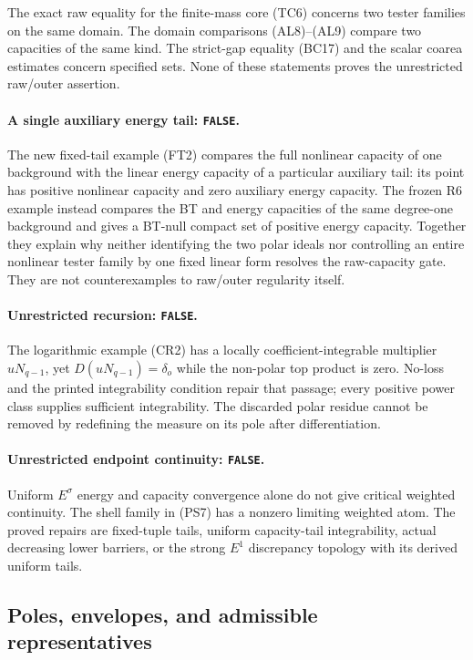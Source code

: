 The exact raw equality for the finite-mass core
(TC6) concerns two tester families on the same
domain.  The domain comparisons (AL8)--(AL9)
compare two capacities of the same kind.
The strict-gap equality (BC17) and the scalar
coarea estimates concern specified sets.
None of these statements proves the unrestricted
raw/outer assertion.

\paragraph{A single auxiliary energy tail: \texttt{FALSE}.}
The new fixed-tail example (FT2) compares the full
nonlinear capacity of one background with the
linear energy capacity of a particular auxiliary
tail: its point has positive nonlinear capacity
and zero auxiliary energy capacity. The frozen R6
example instead compares the BT and energy capacities
of the same degree-one background and gives a BT-null
compact set of positive energy capacity.
Together they explain why neither identifying
the two polar ideals nor controlling an entire
nonlinear tester family by one fixed linear
form resolves the raw-capacity gate.
They are not counterexamples to raw/outer
regularity itself.

\paragraph{Unrestricted recursion: \texttt{FALSE}.}
The logarithmic example (CR2) has a locally
coefficient-integrable multiplier
$uN_{q-1}$, yet
$D(uN_{q-1})=\delta_o$ while the non-polar
top product is zero.
No-loss and the printed integrability
condition repair that passage; every positive
power class supplies sufficient integrability.
The discarded polar residue cannot be removed
by redefining the measure on its pole after
differentiation.

\paragraph{Unrestricted endpoint continuity: \texttt{FALSE}.}
Uniform $E^\sigma$ energy and capacity convergence
alone do not give critical weighted continuity.
The shell family in (PS7) has a nonzero limiting
weighted atom.
The proved repairs are fixed-tuple tails,
uniform capacity-tail integrability, actual
decreasing lower barriers, or the strong
$E^1$ discrepancy topology with its derived
uniform tails.

\subsection{Poles, envelopes, and admissible representatives}

